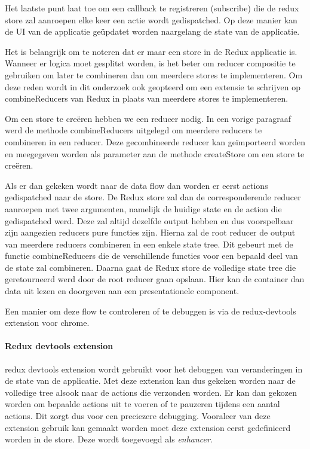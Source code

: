 Het laatste punt laat toe om een callback te registreren (subscribe) die de redux store zal aanroepen elke keer een actie wordt gedispatched. Op deze manier kan de UI van de applicatie geüpdatet worden naargelang de state van de applicatie. 

Het is belangrijk om te noteren dat er maar een store in de Redux applicatie is. Wanneer er logica moet gesplitst worden, is het beter om reducer compositie te gebruiken om later te combineren dan om meerdere stores te implementeren. Om deze reden wordt in dit onderzoek ook geopteerd om een extensie te schrijven op combineReducers van Redux in plaats van meerdere stores te implementeren.

Om een store te creëren hebben we een reducer nodig. In een vorige paragraaf werd de methode combineReducers uitgelegd om meerdere reducers te combineren in een reducer. Deze gecombineerde reducer kan geïmporteerd worden en meegegeven worden als parameter aan de methode createStore om een store te creëren.

Als er dan gekeken wordt naar de data flow dan worden er eerst actions gedispatched naar de store. De Redux store zal dan de corresponderende reducer aanroepen met twee argumenten, namelijk de huidige state en de action die gedispatched werd. Deze zal altijd dezelfde output hebben en dus voorspelbaar zijn aangezien reducers pure functies zijn.	 Hierna zal de root reducer de output van meerdere reducers combineren in een enkele state tree. Dit gebeurt met de functie combineReducers die de verschillende functies voor een bepaald deel van de state zal combineren. Daarna gaat de Redux store de volledige state tree die geretourneerd werd door de root reducer gaan opslaan. Hier kan de container dan data uit lezen en doorgeven aan een presentationele component.

Een manier om deze flow te controleren of te debuggen is via de redux-devtools extension voor chrome. 

\paragraph{Redux devtools extension}
redux devtools extension wordt gebruikt voor het debuggen van veranderingen in de state van de applicatie. Met deze extension kan dus gekeken worden naar de volledige tree alsook naar de actions die verzonden worden. Er kan dan gekozen worden om bepaalde actions uit te voeren of te pauzeren tijdens een aantal actions. Dit zorgt dus voor een preciezere debugging. Vooraleer van deze extension gebruik kan gemaakt worden moet deze extension eerst gedefinieerd worden in de store. Deze wordt toegevoegd als \textit{enhancer}. 


